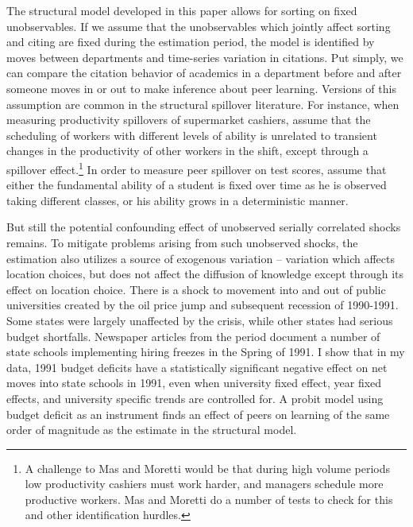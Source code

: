 The structural model developed in this paper allows for sorting on fixed
unobservables. If we assume that the unobservables which jointly affect
sorting and citing are fixed during the estimation period, the model is
identified by moves between departments and time-series variation in
citations. Put simply, we can compare the citation behavior of academics
in a department before and after someone moves in or out to make
inference about peer learning. Versions of this assumption are common in
the structural spillover literature. For instance, when measuring
productivity spillovers of supermarket cashiers, \citet{mas2009peers}
assume that the scheduling of workers with different levels of ability is unrelated
to transient changes in the productivity of other workers in the shift,
except through a spillover effect.\footnote{A
challenge to Mas and Moretti would be that during high volume periods
low productivity cashiers must work harder, and managers schedule more
productive workers.  Mas and Moretti do a number of tests to check for
this and other identification hurdles.}
In order to measure peer spillover on test scores,
\citet{arcidiacono2012estimating} assume that either the fundamental ability of a
student is fixed over time as he is observed taking different classes,
or his ability grows in a deterministic manner.

But still the potential confounding effect of unobserved serially
correlated shocks remains. To mitigate problems arising from such
unobserved shocks, the estimation also utilizes a source of exogenous
variation -- variation which affects location choices, but does not
affect the diffusion of knowledge except through its effect on location
choice. There is a shock to movement into and out of public universities
created by the oil price jump and subsequent recession of 1990-1991.
Some states were largely unaffected by the crisis, while other states
had serious budget shortfalls. Newspaper articles from the period
document a number of state schools implementing hiring freezes in the
Spring of 1991. I show that in my data, 1991 budget deficits have a
statistically significant negative effect on net moves into state
schools in 1991, even when university fixed effect, year fixed effects,
and university specific trends are controlled for. A probit model
using budget deficit as an instrument finds an effect of peers on
learning of the same order of magnitude as the estimate in the
structural model.

